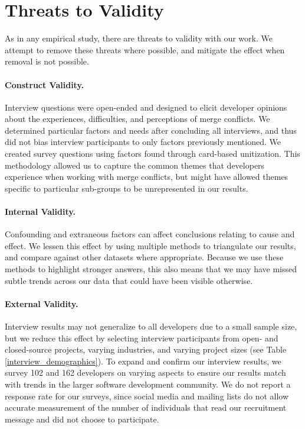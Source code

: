 \section{Threats to Validity}\label{threats}
As in any empirical study, there are threats to validity with our work.
We attempt to remove these threats where possible, and mitigate the effect when removal is not possible.

\paragraph{Construct Validity.}
Interview questions were open-ended and designed to elicit developer opinions about the experiences, difficulties, and perceptions of merge conflicts.
We determined particular factors and needs after concluding all interviews, and thus did not bias interview participants to only factors previously mentioned.
We created survey questions using factors found through card-based unitization.
This methodology allowed us to capture the common themes that developers experience when working with merge conflicts, but might have allowed themes specific to particular sub-groups to be unrepresented in our results.

\paragraph{Internal Validity.}
Confounding and extraneous factors can affect conclusions relating to cause and effect.
We lessen this effect by using multiple methods to triangulate our results, and compare against other datasets where appropriate.
Because we use these methods to highlight stronger answers, this also means that we may have missed subtle trends across our data that could have been visible otherwise.

\paragraph{External Validity.}
Interview results may not generalize to all developers due to a small sample size, but we reduce this effect by selecting interview participants from open- and closed-source projects, varying industries, and varying project sizes (see Table \ref{interview_demographics}).
To expand and confirm our interview results, we survey 102 and 162 developers on varying aspects to ensure our results match with trends in the larger software development community.
We do not report a response rate for our surveys, since social media and mailing lists do not allow accurate measurement of the number of individuals that read our recruitment message and did not choose to participate.

